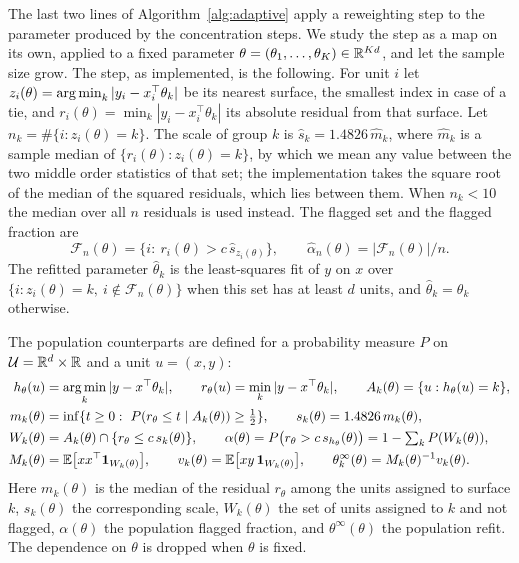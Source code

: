 The last two lines of Algorithm~\ref{alg:adaptive} apply a reweighting step to the
parameter produced by the concentration steps. We study the step as a map on its own,
applied to a fixed parameter $\theta=(\theta_1,\dots,\theta_K)\in\mathbb{R}^{Kd}$, and let the
sample size grow. The step, as implemented, is the following. For unit $i$ let
$z_i(\theta)=\operatorname*{arg\,min}_k|y_i-x_i^{\top}\theta_k|$ be its nearest surface, the smallest index in
case of a tie, and $r_i(\theta)=\min_k|y_i-x_i^{\top}\theta_k|$ its absolute residual from
that surface. Let $n_k=\#\{i:z_i(\theta)=k\}$. The scale of group $k$ is
$\hat s_k=1.4826\,\hat m_k$, where $\hat m_k$ is a sample median of
$\{r_i(\theta):z_i(\theta)=k\}$, by which we mean any value between the two middle order
statistics of that set; the implementation takes the square root of the median of the
squared residuals, which lies between them. When $n_k<10$ the median over all $n$ residuals
is used instead. The flagged set and the flagged fraction are
\[
\mathcal F_n(\theta)=\{i:\ r_i(\theta)>c\,\hat s_{z_i(\theta)}\},\qquad
\hat\alpha_n(\theta)=|\mathcal F_n(\theta)|/n .
\]
The refitted parameter $\hat\theta_k$ is the least-squares fit of $y$ on $x$ over
$\{i:z_i(\theta)=k,\ i\notin\mathcal F_n(\theta)\}$ when this set has at least $d$ units, and
$\hat\theta_k=\theta_k$ otherwise.

The population counterparts are defined for a probability measure $P$ on
$\mathcal U=\mathbb{R}^{d}\times\mathbb{R}$ and a unit $u=(x,y)$:
\begin{align*}
h_\theta(u)&=\operatorname*{arg\,min}_k|y-x^{\top}\theta_k|,\qquad
r_\theta(u)=\min_k|y-x^{\top}\theta_k|,\qquad
A_k(\theta)=\{u:h_\theta(u)=k\},\\
m_k(\theta)&=\inf\{t\ge0:\ P(r_\theta\le t\mid A_k(\theta))\ge\tfrac12\},\qquad
s_k(\theta)=1.4826\,m_k(\theta),\\
W_k(\theta)&=A_k(\theta)\cap\{r_\theta\le c\,s_k(\theta)\},\qquad
\alpha(\theta)=P\bigl(r_\theta>c\,s_{h_\theta}(\theta)\bigr)=1-\textstyle\sum_kP(W_k(\theta)),\\
M_k(\theta)&=\mathbb{E}\bigl[xx^{\top}\mathbf{1}_{W_k(\theta)}\bigr],\qquad
v_k(\theta)=\mathbb{E}\bigl[xy\,\mathbf{1}_{W_k(\theta)}\bigr],\qquad
\theta^{\infty}_k(\theta)=M_k(\theta)^{-1}v_k(\theta).
\end{align*}
Here $m_k(\theta)$ is the median of the residual $r_\theta$ among the units assigned to
surface $k$, $s_k(\theta)$ the corresponding scale, $W_k(\theta)$ the set of units assigned to
$k$ and not flagged, $\alpha(\theta)$ the population flagged fraction, and
$\theta^{\infty}(\theta)$ the population refit. The dependence on $\theta$ is dropped when
$\theta$ is fixed.

